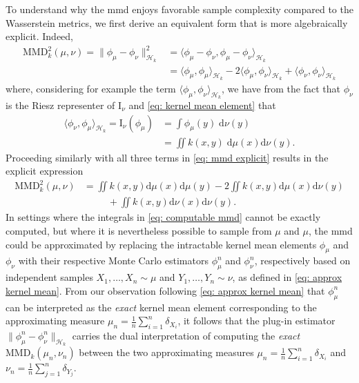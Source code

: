 \documentclass[12pt,paper=letter]{scrreprt}
\begin{document}
To understand why the \ac{mmd} enjoys favorable sample complexity compared to the Wasserstein metrics, we first derive an equivalent form that is more algebraically explicit.
Indeed, 
\begin{align}
\mathrm{MMD}_k^2(\mu,\nu) = \|\phi_\mu - \phi_\nu \|_{\mathcal{H}_k}^2 & = \langle \phi_\mu - \phi_\nu , \phi_\mu - \phi_\nu \rangle_{\mathcal{H}_k} \label{eq: mmd explicit} \\
& = \langle \phi_\mu , \phi_\mu \rangle_{\mathcal{H}_k} - 2 \langle \phi_\mu , \phi_\nu \rangle_{\mathcal{H}_k} + \langle \phi_\nu , \phi_\nu \rangle_{\mathcal{H}_k} \nonumber
\end{align}
where, considering for example the term $\langle \phi_\mu , \phi_\nu \rangle_{\mathcal{H}_k}$, we have from the fact that $\phi_\nu$ is the Riesz representer of $\mathrm{I}_\nu$ and \eqref{eq: kernel mean element} that 
\begin{align}
\langle \phi_\nu , \phi_\mu \rangle_{\mathcal{H}_k} = \mathrm{I}_\nu(\phi_\mu) & = \int \phi_\mu(y) \; \mathrm{d}\nu(y) \nonumber \\
& = \iint k(x,y) \; \mathrm{d}\mu(x) \mathrm{d}\nu(y). \label{eq: kernel mean inner prod}
\end{align}
Proceeding similarly with all three terms in \eqref{eq: mmd explicit} results in the explicit expression
\begin{align} 
\mathrm{MMD}_k^2(\mu,\nu) & = \iint k(x,y) \mathrm{d}\mu(x) \mathrm{d}\mu(y) - 2 \iint k(x,y) \mathrm{d}\mu(x) \mathrm{d}\nu(y) \nonumber \\
& \hspace{30pt} + \iint k(x,y) \mathrm{d}\nu(x) \mathrm{d}\nu(y) . \label{eq: computable mmd}
\end{align}
In settings where the integrals in \eqref{eq: computable mmd} cannot be exactly computed, but where it is nevertheless possible to sample from $\mu$ and $\mu$, the \ac{mmd} could be approximated by replacing the intractable kernel mean elements $\phi_\mu$ and $\phi_\nu$ with their respective Monte Carlo estimators $\phi_\mu^n$ and $\phi_\nu^n$, respectively based on independent samples $X_1,\dots,X_n \sim \mu$ and $Y_1,\dots,Y_n \sim \nu$, as defined in \eqref{eq: approx kernel mean}.
From our observation following \eqref{eq: approx kernel mean} that $\phi_\mu^n$ can be interpreted as the \emph{exact} kernel mean element corresponding to the approximating measure $\mu_n = \frac{1}{n} \sum_{i=1}^n \delta_{X_i}$, it follows that the plug-in estimator $\|\phi_\mu^n - \phi_\nu^n \|_{\mathcal{H}_k}$ carries the dual interpretation of computing the \emph{exact} $\mathrm{MMD}_k(\mu_n,\nu_n)$ between the two approximating measures $\mu_n = \frac{1}{n} \sum_{i=1}^n \delta_{X_i}$ and $\nu_n = \frac{1}{n} \sum_{j=1}^n \delta_{Y_j}$.
\end{document}
